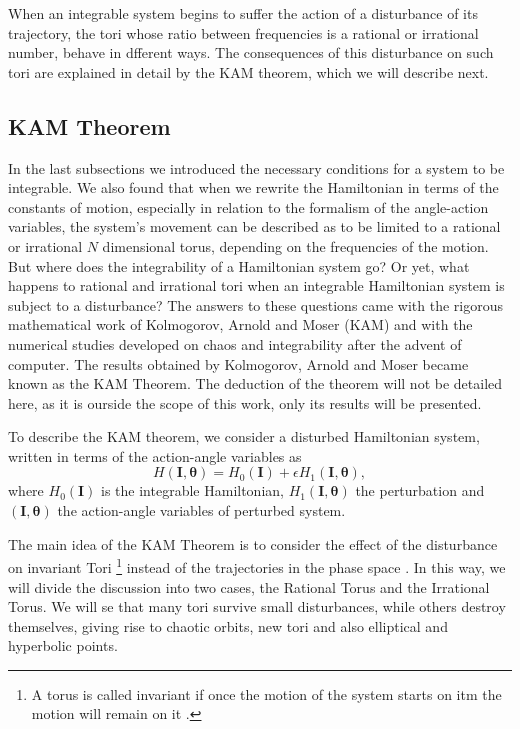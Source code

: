 When an integrable system begins to suffer the action of a disturbance of its trajectory, the tori whose ratio between frequencies is a rational or irrational number, behave in dfferent ways. The consequences of this disturbance on such tori are explained in detail by the KAM theorem, which we will describe next.


\subsection{KAM Theorem}
In the last subsections we introduced the necessary conditions for a system to be integrable. We also found that when we rewrite the Hamiltonian in terms of the constants of motion, especially in relation to the formalism of the angle-action variables, the system's movement can be described as to be limited to a rational or irrational $N$ dimensional torus, depending on the frequencies of the motion. But where does the integrability of a Hamiltonian system go? Or yet, what happens to rational and irrational tori when an integrable Hamiltonian system is subject to a disturbance? The answers to these questions came with the rigorous mathematical work of Kolmogorov, Arnold and Moser (KAM) and with the numerical studies developed on chaos and integrability after the advent of computer. The results obtained by Kolmogorov, Arnold and Moser became known as the KAM Theorem. The deduction of the theorem will not be detailed here, as it is ourside the scope of this work, only its results will be presented.\par

To describe the KAM theorem, we consider a disturbed Hamiltonian system, written in terms of the action-angle variables as
\begin{equation}
H(\bm{I},\bm{\theta})=H_0(\bm{I})+\epsilon H_1(\bm{I},\bm{\theta}),
\end{equation}
where $H_0(\bm{I})$ is the integrable Hamiltonian, $H_1(\bm{I},\bm{\theta})$ the perturbation and $(\bm{I},\bm{\theta})$ the action-angle variables of perturbed system.\par

The main idea of the KAM Theorem is to consider the effect of the disturbance on invariant Tori \footnote{A torus is called invariant if once the motion of the system starts on itm the motion will remain on it \cite{ott_chaos_2002}.} instead of the trajectories in the phase space \cite{zaslavsky2005hamiltonian}. In this way, we will divide the discussion into two cases, the Rational Torus and the Irrational Torus. We will se that many tori survive small disturbances, while others destroy themselves, giving rise to chaotic orbits, new tori and also elliptical and hyperbolic points.



